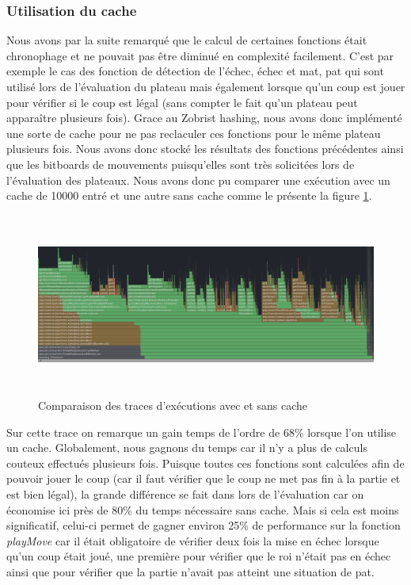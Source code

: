 \documentclass{article}
\begin{document}
\subsubsection{Utilisation du cache}
 Nous avons par la suite 
remarqué que le calcul de certaines fonctions était chronophage et ne pouvait pas être diminué en complexité facilement. C'est par exemple le cas des fonction de détection de 
l'échec, échec et mat, pat qui sont utilisé lors de l'évaluation du plateau mais également lorsque qu'un coup est jouer pour vérifier si le coup est légal (sans compter le fait 
qu'un plateau peut apparaître plusieurs fois). Grace au Zobrist hashing, nous avons donc implémenté une sorte de cache pour ne pas reclaculer ces fonctions pour le même plateau 
plusieurs fois. Nous avons donc stocké les résultats des fonctions précédentes ainsi que les bitboards de mouvements puisqu'elles sont très solicitées lors de l'évaluation des
plateaux. Nous avons donc pu comparer une exécution avec un cache de 10000 entré et une autre sans cache comme le présente la figure \ref{cache_cmp}.

\begin{figure}[h]
    \centering
    \includegraphics[width=\textwidth,height=6.0cm,keepaspectratio]{cache_compare.png}
    \caption{Comparaison des traces d'exécutions avec et sans cache}
    \label{cache_cmp}
\end{figure}
\FloatBarrier

Sur cette trace on remarque un gain temps de l'ordre de 68\% lorsque l'on utilise un cache. Globalement, nous gagnons du temps car il n'y a plus de calculs couteux
effectués plusieurs fois. Puisque toutes ces fonctions sont calculées afin de pouvoir jouer le coup (car il faut vérifier que le coup ne met pas fin à la partie et 
est bien légal), la grande différence se fait dans lors de l'évaluation car on économise ici près de 80\% du temps nécessaire sans cache. Mais si cela est moins significatif,
celui-ci permet de gagner environ 25\% de performance sur la fonction \textit{playMove} car il était obligatoire de vérifier deux fois la mise en échec lorsque qu'un coup était joué,
une première pour vérifier que le roi n'était pas en échec ainsi que pour vérifier que la partie n'avait pas atteint une situation de pat.\\
\end{document}
